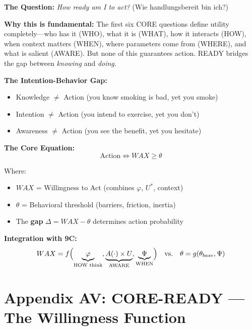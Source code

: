 \begin{tcolorbox}[colback=purple!5!white, colframe=purple!75!black,
    title=\textbf{CORE-READY: The Seventh Fundamental Question (9C)}]

\textbf{The Question:} \textit{How ready am I to act?} (Wie handlungsbereit bin ich?)

\textbf{Why this is fundamental:} The first six CORE questions define utility completely---who has it (WHO), what it is (WHAT), how it interacts (HOW), when context matters (WHEN), where parameters come from (WHERE), and what is salient (AWARE). But none of this guarantees action. READY bridges the gap between \textit{knowing} and \textit{doing}.

\textbf{The Intention-Behavior Gap:}
\begin{itemize}[nosep]
    \item Knowledge $\neq$ Action (you know smoking is bad, yet you smoke)
    \item Intention $\neq$ Action (you intend to exercise, yet you don't)
    \item Awareness $\neq$ Action (you see the benefit, yet you hesitate)
\end{itemize}

\textbf{The Core Equation:}
\[
\boxed{\text{Action} \Leftrightarrow WAX \geq \theta}
\]

Where:
\begin{itemize}[nosep]
    \item $WAX$ = Willingness to Act (combines $\varphi$, $U^*$, context)
    \item $\theta$ = Behavioral threshold (barriers, friction, inertia)
    \item The \textbf{gap} $\Delta = WAX - \theta$ determines action probability
\end{itemize}

\textbf{Integration with 9C:}
\[
WAX = f\Bigl(\underbrace{\varphi}_{\text{HOW think}}, \underbrace{A(\cdot) \times U}_{\text{AWARE}}, \underbrace{\Psi}_{\text{WHEN}}\Bigr) \quad \text{vs.} \quad \theta = g(\theta_{base}, \Psi)
\]

\end{tcolorbox}

\section*{Appendix AV: CORE-READY — The Willingness Function}
\label{app:core-ready}
\label{app:willingness-formalization}


